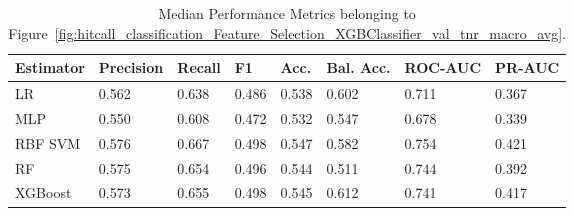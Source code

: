 \begin{longtable}{llllllll}
\caption{Median Performance Metrics belonging to Figure~\ref{fig:hitcall_classification_Feature_Selection_XGBClassifier_val_tnr_macro_avg}.}\label{tab:table:hitcall_classification_feature_selection_xgbclassifier_val_tnr_macro_avg}\\
\toprule
\midrule
\small Estimator & \small Precision & \small Recall & \small F1 & \small Acc. & \small Bal. Acc. & \small ROC-AUC & \small PR-AUC\\
\hline
LR & 0.562 & 0.638 & 0.486 & 0.538 & 0.602 & 0.711 & 0.367\\
MLP & 0.550 & 0.608 & 0.472 & 0.532 & 0.547 & 0.678 & 0.339\\
RBF SVM & 0.576 & 0.667 & 0.498 & 0.547 & 0.582 & 0.754 & 0.421\\
RF & 0.575 & 0.654 & 0.496 & 0.544 & 0.511 & 0.744 & 0.392\\
XGBoost & 0.573 & 0.655 & 0.498 & 0.545 & 0.612 & 0.741 & 0.417\\
\bottomrule
\end{longtable}